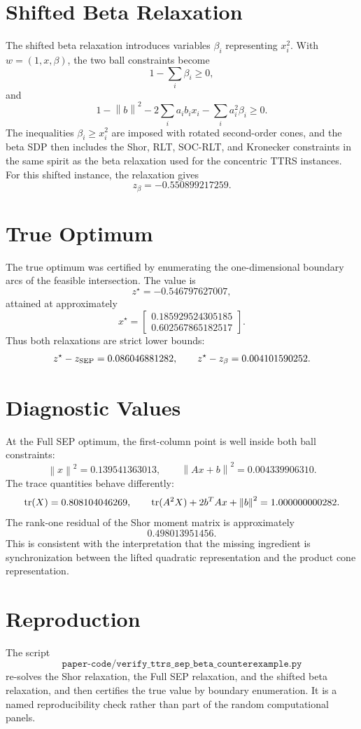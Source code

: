 \documentclass[11pt]{article}
\newcommand{\tran}{^T}
\newcommand{\norm}[1]{\left\lVert #1\right\rVert}
\begin{document}
\section{Shifted Beta Relaxation}

The shifted beta relaxation introduces variables \(\beta_i\) representing
\(x_i^2\).  With \(w=(1,x,\beta)\), the two ball constraints become
\[
    1-\sum_i\beta_i\geq0,
\]
and
\[
    1-\norm{b}^2-2\sum_i a_ib_ix_i-\sum_i a_i^2\beta_i\geq0.
\]
The inequalities \(\beta_i\geq x_i^2\) are imposed with rotated second-order
cones, and the beta SDP then includes the Shor, RLT, SOC-RLT, and Kronecker
constraints in the same spirit as the beta relaxation used for the concentric
TTRS instances.  For this shifted instance, the relaxation gives
\[
    z_{\beta}=-0.550899217259.
\]

\section{True Optimum}

The true optimum was certified by enumerating the one-dimensional boundary arcs
of the feasible intersection.  The value is
\[
    z^\star=-0.546797627007,
\]
attained at approximately
\[
    x^\star =
    \begin{bmatrix}
    0.185929524305185\\[2pt]
    0.602567865182517
    \end{bmatrix}.
\]
Thus both relaxations are strict lower bounds:
\[
    z^\star-z_{\rm SEP}=0.086046881282,\qquad
    z^\star-z_{\beta}=0.004101590252.
\]

\section{Diagnostic Values}

At the Full SEP optimum, the first-column point is well inside both ball
constraints:
\[
    \norm{x}^2=0.139541363013,\qquad
    \norm{Ax+b}^2=0.004339906310.
\]
The trace quantities behave differently:
\[
    {\rm tr}(X)=0.808104046269,\qquad
    {\rm tr}(A^2X)+2b\tran Ax+\norm{b}^2=1.000000000282.
\]
The rank-one residual of the Shor moment matrix is approximately
\[
    0.498013951456.
\]
This is consistent with the interpretation that the missing ingredient is
synchronization between the lifted quadratic representation and the product
cone representation.

\section{Reproduction}

The script
\[
    \texttt{paper-code/verify\_ttrs\_sep\_beta\_counterexample.py}
\]
re-solves the Shor relaxation, the Full SEP relaxation, and the shifted beta
relaxation, and then certifies the true value by boundary enumeration.  It is a
named reproducibility check rather than part of the random computational panels.
\end{document}
